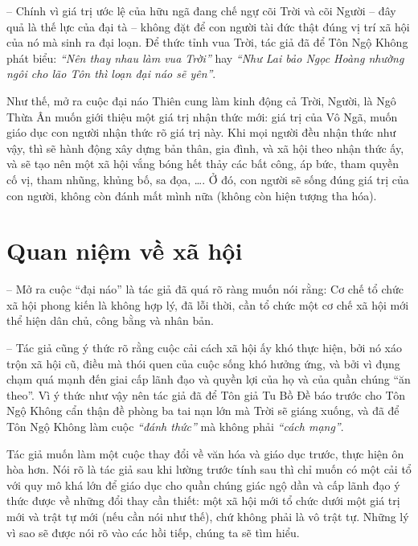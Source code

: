 -- Chính vì giá trị ước lệ của hữu ngã đang chế ngự cõi Trời và cõi Người -- đây quả là thế lực của đại tà -- không đặt để con người tài đức thật đúng vị trí xã hội của nó mà sinh ra đại loạn. Để thức tỉnh vua Trời, tác giả đã để Tôn Ngộ Không phát biểu: \emph{``Nên thay nhau làm vua Trời''} hay \emph{``Như Lai bảo Ngọc Hoàng nhường ngôi cho lão Tôn thì loạn đại náo sẽ yên''}.

Như thế, mở ra cuộc đại náo Thiên cung làm kinh động cả Trời, Người, là Ngô Thừa Ân muốn giới thiệu một giá trị nhận thức mới: giá trị của Vô Ngã, muốn giáo dục con người nhận thức rõ giá trị này. Khi mọi người đều nhận thức như vậy, thì sẽ hành động xây dựng bản thân, gia đình, và xã hội theo nhận thức ấy, và sẽ tạo nên một xã hội vắng bóng hết thảy các bất công, áp bức, tham quyền cố vị, tham nhũng, khủng bố, sa đọa, \ldots. Ở đó, con người sẽ sống đúng giá trị của con người, không còn đánh mất mình nữa (không còn hiện tượng tha hóa).


\section{Quan niệm về xã hội} %
\label{sec:4_xa_hoi}

-- Mở ra cuộc ``đại náo'' là tác giả đã quá rõ ràng muốn nói rằng: Cơ chế tổ chức xã hội phong kiến là không hợp lý, đã lỗi thời, cần tổ chức một cơ chế xã hội mới thể hiện dân chủ, công bằng và nhân bản.

-- Tác giả cũng ý thức rõ rằng cuộc cải cách xã hội ấy khó thực hiện, bởi nó xáo trộn xã hội cũ, điều mà thói quen của cuộc sống khó hưởng ứng, và bởi vì đụng chạm quá mạnh đến giai cấp lãnh đạo và quyền lợi của họ và của quần chúng ``ăn theo''. Vì ý thức như vậy nên tác giả đã để Tôn giả Tu Bồ Đề báo trước cho Tôn Ngộ Không cẩn thận đề phòng ba tai nạn lớn mà Trời sẽ giáng xuống, và đã để Tôn Ngộ Không làm cuộc \emph{``đánh thức''} mà không phải \emph{``cách mạng''}.

Tác giả muốn làm một cuộc thay đổi về văn hóa và giáo dục trước, thực hiện ôn hòa hơn. Nói rõ là tác giả sau khi lường trước tính sau thì chỉ muốn có một cải tổ với quy mô khá lớn để giáo dục cho quần chúng giác ngộ dần và cấp lãnh đạo ý thức được về những đổi thay cần thiết: một xã hội mới tổ chức dưới một giá trị mới và trật tự mới (nếu cần nói như thế), chứ không phải là vô trật tự. Những lý vì sao sẽ được nói rõ vào các hồi tiếp, chúng ta sẽ tìm hiểu.

